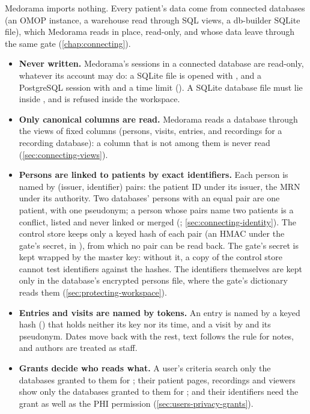 Medorama imports nothing. Every patient's data come from connected databases (an OMOP instance, a
warehouse read through SQL views, a db-builder SQLite file), which Medorama reads in place,
read-only, and whose data leave through the same gate (\cref{chap:connecting}).
\begin{itemize}
\item \textbf{Never written.} Medorama's sessions in a connected database are read-only, whatever
  its account may do: a SQLite file is opened with , and a PostgreSQL session
  with  and a time limit (). A SQLite
  database file must lie inside , and is refused inside the workspace.
\item \textbf{Only canonical columns are read.} Medorama reads a database through the views of
  fixed columns (persons, visits, entries, and recordings for a recording database): a column that
  is not among them is never read (\cref{sec:connecting-views}).
\item \textbf{Persons are linked to patients by exact identifiers.} Each person is named by
  (issuer, identifier) pairs: the patient ID under its issuer, the MRN under its authority. Two
  databases' persons with an equal pair are one patient, with one pseudonym; a person whose pairs
  name two patients is a conflict, listed and never linked or merged (;
  \cref{sec:connecting-identity}). The control store keeps only a keyed hash of each pair (an
  HMAC under the gate's secret, in ), from which no pair can be read back.
  The gate's secret is kept wrapped by the master key: without it, a copy of the control store
  cannot test identifiers against the hashes.
  The identifiers themselves are kept only in the database's encrypted persons file, where the
  gate's dictionary reads them (\cref{sec:protecting-workspace}).
\item \textbf{Entries and visits are named by tokens.} An entry is named by a keyed hash
  () that holds neither its key nor its time, and a visit by
   and its pseudonym. Dates move back with the rest, text follows the
  rule for notes, and authors are treated as staff.
\item \textbf{Grants decide who reads what.} A user's criteria search only the databases granted
  to them for ; their patient pages, recordings and viewers show only the databases
  granted to them for ; and their identifiers need the  grant as well as the
  PHI permission (\cref{sec:users-privacy-grants}).
\end{itemize}

